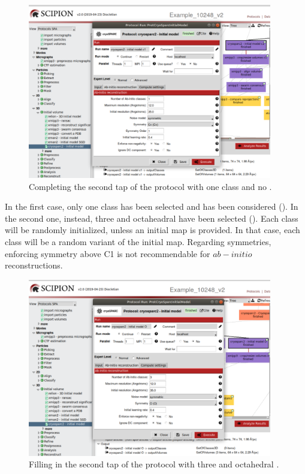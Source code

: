 \begin{figure}[H]
  \centering
  \captionsetup{width=.8\linewidth} 
  \includegraphics[width=0.95\textwidth]
  {images/initial_vol_1.pdf}
  \caption{Completing the second tap of the protocol  with one  class and no .}
  \label{fig:initial_vol_1}
  \end{figure}
  
In the first case, only one  class has been selected and  has been considered (). In the second one, instead, three  and octaheadral  have been selected (). Each  class will be randomly initialized, unless an initial map is provided. In that case, each class will be a random variant of the initial map. Regarding symmetries, enforcing symmetry above C1 is not recommendable for $ab-initio$ reconstructions.

\begin{figure}[H]
  \centering
  \captionsetup{width=.8\linewidth} 
  \includegraphics[width=0.95\textwidth]
  {images/initial_vol_3.pdf}
  \caption{Filling in the second tap of the protocol  with three  and octahedral .}
  \label{fig:initial_vol_3}
  \end{figure}
  
